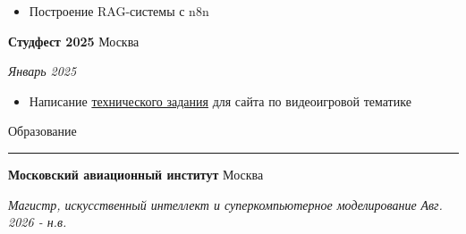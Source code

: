 \documentclass[14pt, a4paper, oneside]{extarticle}
\begin{document}

\begin{itemize}
	\vspace{-2\intextsep}
	\item Построение RAG-системы с n8n
\end{itemize}


\begin{flushleft}
	\vspace{-0.8\intextsep}
	\quad
	\textbf{Студфест 2025}
	\hfill
	Москва
\end{flushleft}

\begin{flushleft}
	\vspace{-1\intextsep}
	\quad
	\hfill
	\textit{\small Январь 2025}
\end{flushleft}


\begin{itemize}
	\vspace{-2\intextsep}
	\item Написание \href{https://github.com/Crazy5202/job_application_form/tree/main/portfolio/OnlyGames%5B%D0%A2ex_%D0%97%D0%B0%D0%B4%D0%B0%D0%BD%D0%B8%D0%B5%5D.pdf}{технического задания} для сайта по видеоигровой тематике
\end{itemize}


\begin{flushleft}
	\vspace{-\intextsep}
	\large Образование
\end{flushleft}

\vspace{-0.8\intextsep}
\hrule


\begin{flushleft}
	\vspace{-0.8\intextsep}
	\quad
	\textbf{Московский авиационный институт}
	\hfill
	Москва
\end{flushleft}

\begin{flushleft}
	\vspace{-\intextsep}
	\quad
	\textit{\footnotesize Магистр, %
	искусственный интеллект и суперкомпьютерное моделирование}
	\hfill
	\textit{\small Авг. 2026 - н.в.}
\end{flushleft}
\end{document}
